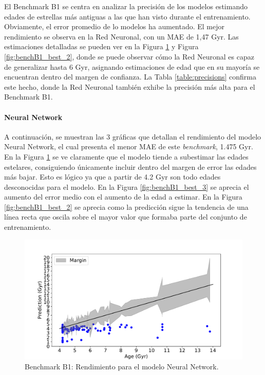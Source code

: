 El Benchmark B1 se centra en analizar la precisión de los modelos estimando edades de estrellas más antiguas a las que han visto durante el entrenamiento. Obviamente, el error promedio de lo modelos ha aumentado. El mejor rendimiento se observa en la Red Neuronal, con un MAE de 1,47 Gyr. Las estimaciones detalladas se pueden ver en la Figura \ref{fig:benchB1_best_1} y Figura \ref{fig:benchB1_best_2}, donde se puede observar cómo la Red Neuronal es capaz de generalizar hasta 6 Gyr, asignando estimaciones de edad que en su mayoría se encuentran dentro del margen de confianza. La Tabla \ref{table:precisions} confirma este hecho, donde la Red Neuronal también exhibe la precisión más alta para el Benchmark B1.

\paragraph{Neural Network} 
A continuación, se muestran las 3 gráficas que detallan el rendimiento del modelo Neural Network, el cual presenta el menor MAE de este \emph{benchmark}, 1.475 Gyr. En la Figura \ref{fig:benchB1_best_1} se ve claramente que el modelo tiende a subestimar las edades estelares, consiguiendo únicamente incluir dentro del margen de error las edades más bajar. Esto es lógico ya que a partir de 4.2 Gyr son todo edades desconocidas para el modelo. En la Figura \ref{fig:benchB1_best_3} se aprecia el aumento del error medio con el aumento de la edad a estimar. En la Figura \ref{fig:benchB1_best_2} se aprecia como la predicción sigue la tendencia de una línea recta que oscila sobre el mayor valor que formaba parte del conjunto de entrenamiento. %

\begin{figure}[H]
\begin{center}
 \includegraphics[width=0.8\linewidth]{Figuras/Experimentos/B_B1_nnet_1.pdf}
\end{center}
\caption{Benchmark B1: Rendimiento para el modelo Neural Network.}
 \label{fig:benchB1_best_1}
\end{figure}

